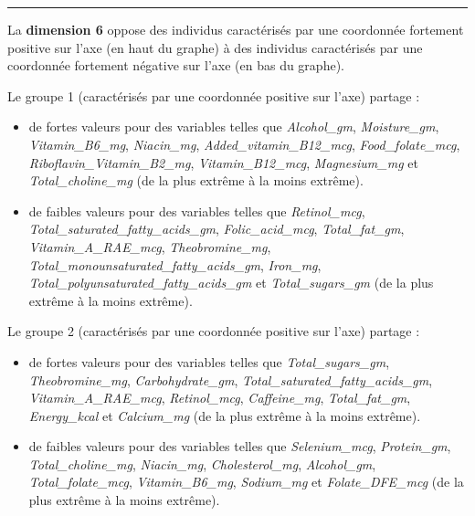 \documentclass[]{article}
\providecommand{\tightlist}{%
  \setlength{\itemsep}{0pt}\setlength{\parskip}{0pt}}
\begin{document}
\begin{center}\rule{0.5\linewidth}{\linethickness}\end{center}

La \textbf{dimension 6} oppose des individus caractérisés par une
coordonnée fortement positive sur l'axe (en haut du graphe) à des
individus caractérisés par une coordonnée fortement négative sur l'axe
(en bas du graphe).

Le groupe 1 (caractérisés par une coordonnée positive sur l'axe) partage
:

\begin{itemize}
\tightlist
\item
  de fortes valeurs pour des variables telles que \emph{Alcohol\_gm},
  \emph{Moisture\_gm}, \emph{Vitamin\_B6\_mg}, \emph{Niacin\_mg},
  \emph{Added\_vitamin\_B12\_mcg}, \emph{Food\_folate\_mcg},
  \emph{Riboflavin\_Vitamin\_B2\_mg}, \emph{Vitamin\_B12\_mcg},
  \emph{Magnesium\_mg} et \emph{Total\_choline\_mg} (de la plus extrême
  à la moins extrême).
\item
  de faibles valeurs pour des variables telles que \emph{Retinol\_mcg},
  \emph{Total\_saturated\_fatty\_acids\_gm}, \emph{Folic\_acid\_mcg},
  \emph{Total\_fat\_gm}, \emph{Vitamin\_A\_RAE\_mcg},
  \emph{Theobromine\_mg},
  \emph{Total\_monounsaturated\_fatty\_acids\_gm}, \emph{Iron\_mg},
  \emph{Total\_polyunsaturated\_fatty\_acids\_gm} et
  \emph{Total\_sugars\_gm} (de la plus extrême à la moins extrême).
\end{itemize}

Le groupe 2 (caractérisés par une coordonnée positive sur l'axe) partage
:

\begin{itemize}
\tightlist
\item
  de fortes valeurs pour des variables telles que
  \emph{Total\_sugars\_gm}, \emph{Theobromine\_mg},
  \emph{Carbohydrate\_gm}, \emph{Total\_saturated\_fatty\_acids\_gm},
  \emph{Vitamin\_A\_RAE\_mcg}, \emph{Retinol\_mcg}, \emph{Caffeine\_mg},
  \emph{Total\_fat\_gm}, \emph{Energy\_kcal} et \emph{Calcium\_mg} (de
  la plus extrême à la moins extrême).
\item
  de faibles valeurs pour des variables telles que \emph{Selenium\_mcg},
  \emph{Protein\_gm}, \emph{Total\_choline\_mg}, \emph{Niacin\_mg},
  \emph{Cholesterol\_mg}, \emph{Alcohol\_gm}, \emph{Total\_folate\_mcg},
  \emph{Vitamin\_B6\_mg}, \emph{Sodium\_mg} et \emph{Folate\_DFE\_mcg}
  (de la plus extrême à la moins extrême).
\end{itemize}
\end{document}
